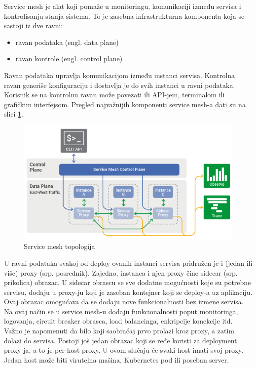 \documentclass[a4paper,12pt]{report}
\begin{document}
Service mesh je alat koji pomaže u monitoringu, komunikaciji između servisa i kontrolisanju stanja sistema. To je zasebna infrastrukturna komponenta koja se sastoji iz dve ravni: 
\begin{itemize}
	\item ravan podataka (engl. data plane)
	\item ravan kontrole (engl. control plane)
\end{itemize}

Ravan podataka upravlja komunikacijom između instanci servisa. Kontrolna ravan generiše konfiguraciju i dostavlja je do svih instanci u ravni podataka. Korisnik se na kontrolnu ravan može povezati ili API-jem, terminalom ili grafičkim interfejsom. Pregled najvažnijih komponenti service mesh-a dati su na slici  \ref{fig:service-mesh-topology}. 

\begin{figure}[h]
    \centering
    \includegraphics[width=\textwidth]{service-mesh-generic-topology}
    \caption{Service mesh topologija}
    \label{fig:service-mesh-topology}
\end{figure}

U ravni podataka svakoj od deploy-ovanih instanci servisa pridružen je i (jedan ili više) proxy (srp. posrednik). Zajedno, instanca i njen proxy čine sidecar (srp. prikolica) obrazac.  U sidecar obrascu se sve dodatne mogućnosti koje su potrebne servisu, dodaju u proxy-ju koji je zaseban kontejner koji se deploy-a uz aplikaciju. Ovaj obrazac omogućava da se dodaju nove funkcionalnosti bez izmene servisa. Na ovaj način se u service mesh-u dodaju funkcionalnosti poput monitoringa, logovanja, circuit breaker obrasca, load balancinga, enkripcije konekcije itd. Važno je napomenuti da bilo koji saobraćaj prvo prolazi kroz proxy, a zatim dolazi do servisa. Postoji još jedan obrazac koji se ređe koristi za deployment proxy-ja, a to je per-host proxy. U ovom slučaju će svaki host imati svoj proxy. Jedan host može biti virutelna mašina, Kubernetes pod ili poseban server.  \newline
\end{document}
